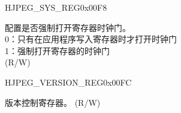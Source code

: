 \begin{register}{H}{JPEG\_SYS\_REG}{0x00F8}\label{regdesc:JPEGSYSREG}
%
%
\regnewline%
\begin{regdesc}\begin{reglist}
\label{fielddesc:JPEGCLKEN}\item [JPEG\_CLK\_EN] 配置是否强制打开寄存器时钟门。\\
0：只有在应用程序写入寄存器时才打开时钟门\\
1：强制打开寄存器的时钟门\\
(R/W)
\end{reglist}\end{regdesc}
\end{register}


\begin{register}{H}{JPEG\_VERSION\_REG}{0x00FC}\label{regdesc:JPEGVERSIONREG}
%
%
\regnewline%
\begin{regdesc}\begin{reglist}
\label{fielddesc:JPEGJPEGVER}\item [JPEG\_JPEG\_VER] 版本控制寄存器。 (R/W)
\end{reglist}\end{regdesc}
\end{register}

